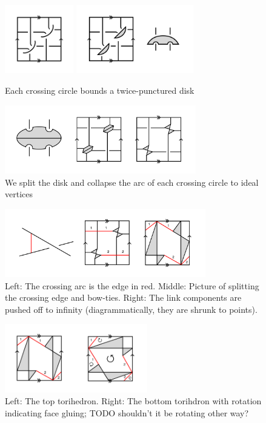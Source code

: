 \documentclass[11pt]{amsart}
\theoremstyle{plain}
\theoremstyle{definition}
\begin{document}
\begin{figure}[h] 
\centering
\includegraphics[height=3cm]{fig-3.png}
\includegraphics[height=3cm]{fig-4.png}
	\caption{Each crossing circle bounds a twice-punctured disk}
	\label{fig:step_one}
\end{figure}
 
\begin{figure}[h] 
\centering 
\includegraphics[height=3cm]{fig-5.png} 
	\caption{We split the disk and collapse the arc of each
 crossing circle to ideal vertices}
	\label{fig:step_two}
\end{figure}


\begin{figure}[h] 
\centering 
\includegraphics[height=3cm]{fig-6.png} 
\caption{Left: The crossing arc is the edge in red.
Middle: Picture of splitting the crossing edge
and bow-ties.
Right: The link components are pushed off to infinity
(diagrammatically, they are shrunk to points).}
	\label{fig:step_three}
\end{figure}

\begin{figure}[h] 
\centering 
\includegraphics[height=3cm]{top-bottom.png} 
	\caption{Left: The top torihedron.
	Right: The bottom torihdron with rotation indicating face gluing;
	TODO shouldn't it be rotating other way?} 
\label{fig:top-bottom}
\end{figure}
\end{document}
